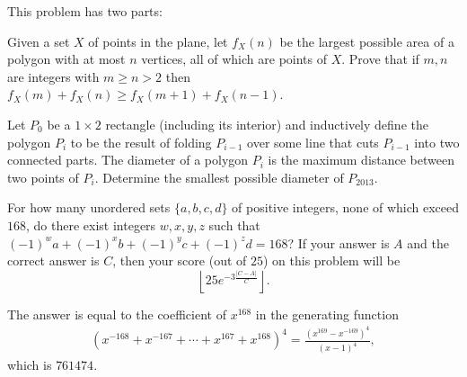 \documentclass[11pt]{article}
\theoremstyle{definition}
\begin{document}
\begin{question}[name={2013 HMIC, \href{https://artofproblemsolving.com/community/c129h530472p3027316}{Problem 5}}]
	This problem has two parts:
	\begin{tasks}
		\task Given a set $X$ of points in the plane, let $f_{X}(n)$ be the largest possible area of a polygon with at most $n$ vertices, all of which are points of $X$. Prove that if $m, n$ are integers with $m \geq n > 2$ then $f_{X}(m) + f_{X}(n) \geq f_{X}(m + 1) + f_{X}(n - 1)$.
		
		\task Let $P_0$ be a $1 \times 2$ rectangle (including its interior) and inductively define the polygon $P_i$ to be the result of folding $P_{i-1}$ over some line that cuts $P_{i-1}$ into two connected parts. The diameter of a polygon $P_i$ is the maximum distance between two points of $P_i$. Determine the smallest possible diameter of $P_{2013}$.
	\end{tasks}
\end{question}




%	







\begin{question}[name={2013 HMMT, Guts, \href{https://artofproblemsolving.com/community/c129h526574p2986254}{Problem 34}}]
	For how many unordered sets $\{a,b,c,d\}$ of positive integers, none of which exceed $168$, do there exist integers $w,x,y,z$ such that $(-1)^wa+(-1)^xb+(-1)^yc+(-1)^zd=168$? If your answer is $A$ and the correct answer is $C$, then your score (out of $25$) on this problem will be $$\left\lfloor25e^{-3\frac{|C-A|}C}\right\rfloor.$$
\end{question}




\begin{solution}%
	The answer is equal to the coefficient of $x^{168}$ in the generating function
	\begin{align*}
		(x^{-168}+x^{-167}+\cdots+x^{167}+x^{168})^4 = \frac{(x^{169}-x^{-169})^4}{(x-1)^4},
	\end{align*}
	which is $\boxed{761474}$.
\end{solution}
\end{document}
